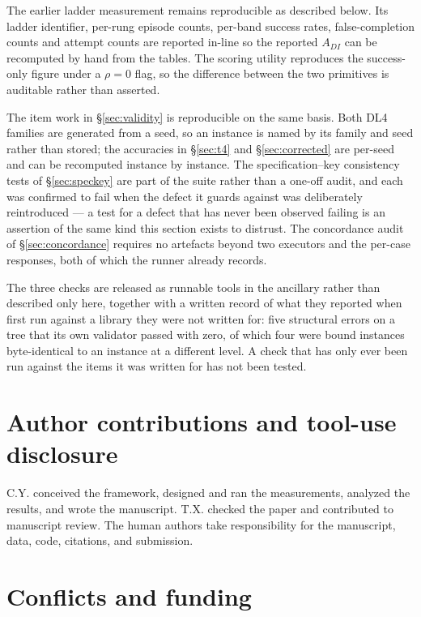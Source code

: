 \documentclass[11pt]{article}
\theoremstyle{definition}
\begin{document}
The earlier ladder measurement remains reproducible as described below. Its ladder identifier, per-rung episode counts, per-band success rates, false-completion counts and attempt counts are reported in-line so the reported $A_{DI}$ can be recomputed by hand from the tables. The scoring utility reproduces the success-only figure under a $\rho = 0$ flag, so the difference between the two primitives is auditable rather than asserted.

The item work in \S\ref{sec:validity} is reproducible on the same basis. Both DL4 families are generated from a seed, so an instance is named by its family and seed rather than stored; the accuracies in \S\ref{sec:t4} and \S\ref{sec:corrected} are per-seed and can be recomputed instance by instance. The specification--key consistency tests of \S\ref{sec:speckey} are part of the suite rather than a one-off audit, and each was confirmed to fail when the defect it guards against was deliberately reintroduced --- a test for a defect that has never been observed failing is an assertion of the same kind this section exists to distrust. The concordance audit of \S\ref{sec:concordance} requires no artefacts beyond two executors and the per-case responses, both of which the runner already records.

The three checks are released as runnable tools in the ancillary  rather than described only here, together with a written record of what they reported when first run against a library they were not written for: five structural errors on a tree that its own validator passed with zero, of which four were bound instances byte-identical to an instance at a different level. A check that has only ever been run against the items it was written for has not been tested.

\section*{Author contributions and tool-use disclosure}

C.Y. conceived the framework, designed and ran the measurements, analyzed the results, and wrote the manuscript. T.X. checked the paper and contributed to manuscript review. The human authors take responsibility for the manuscript, data, code, citations, and submission.

\section*{Conflicts and funding}
\end{document}

